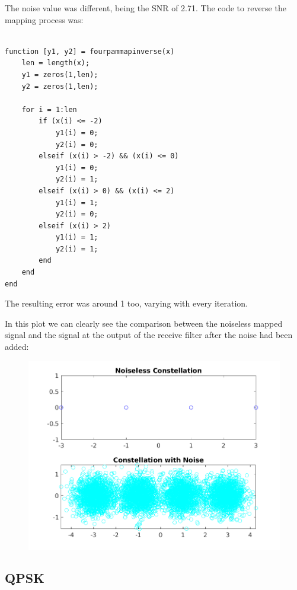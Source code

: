 \documentclass[a4paper,11pt]{article}
\begin{document}
The noise value was different, being the SNR of 2.71. The code to reverse the
mapping process was:

\bigskip
\begin{lstlisting}

function [y1, y2] = fourpammapinverse(x)
    len = length(x);
    y1 = zeros(1,len);
    y2 = zeros(1,len);

    for i = 1:len
        if (x(i) <= -2)
            y1(i) = 0;
            y2(i) = 0;
        elseif (x(i) > -2) && (x(i) <= 0)
            y1(i) = 0;
            y2(i) = 1;
        elseif (x(i) > 0) && (x(i) <= 2)
            y1(i) = 1;
            y2(i) = 0;
        elseif (x(i) > 2)
            y1(i) = 1;
            y2(i) = 1;
        end
    end
end

\end{lstlisting}
\bigskip

The resulting error was around 1 too, varying with every iteration.

In this plot we can clearly see the comparison between the noiseless mapped
signal and the signal at the output of the receive filter after the noise had
been added:

\begin{figure}[!hp]
    \begin{center}
      \includegraphics[width=1\textwidth]{images/4PAM.png}
    \end{center}
\end{figure}

\newpage

\subsection{QPSK}
\end{document}
